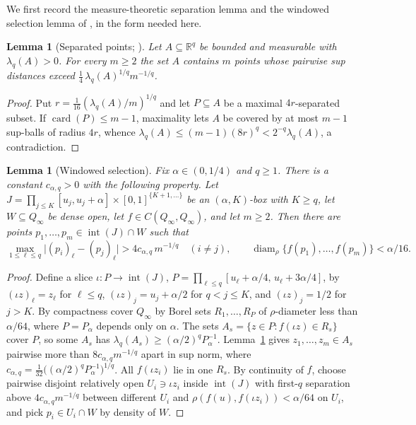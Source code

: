 \documentclass[11pt]{article}
\newtheorem{lemma}[theorem]{Lemma}
\newcommand{\Q}{Q_\infty}
\newcommand{\diam}{\operatorname{diam}}
\begin{document}
We first record the measure-theoretic separation lemma and the windowed selection
lemma of \cite{Shmalo2026}, in the form needed here.

\begin{lemma}[{Separated points; \cite[Lemma 5.1]{Shmalo2026}}]\label{lem:separated}
Let $A\subseteq\mathbb R^{q}$ be bounded and measurable with $\lambda_q(A)>0$.  For
every $m\ge2$ the set $A$ contains $m$ points whose pairwise sup distances exceed
$\tfrac14\,\lambda_q(A)^{1/q}m^{-1/q}$.
\end{lemma}

\begin{proof}
Put $r=\tfrac1{16}(\lambda_q(A)/m)^{1/q}$ and let $P\subseteq A$ be a maximal
$4r$-separated subset.  If $\operatorname{card}(P)\le m-1$, maximality lets $A$ be
covered by at most $m-1$ sup-balls of radius $4r$, whence
$\lambda_q(A)\le(m-1)(8r)^q<2^{-q}\lambda_q(A)$, a contradiction.
\end{proof}

\begin{lemma}[Windowed selection]\label{lem:selection}
Fix $\alpha\in(0,1/4)$ and $q\ge1$.  There is a constant $c_{\alpha,q}>0$ with the
following property.  Let $J=\prod_{j\le K}[u_j,u_j+\alpha]\times[0,1]^{\{K+1,\dots\}}$
be an $(\alpha,K)$-box with $K\ge q$, let $W\subseteq\Q$ be dense open, let
$f\in C(\Q,\Q)$, and let $m\ge2$.  Then there are points
$p_1,\dots,p_m\in\operatorname{int}(J)\cap W$ such that
\[
\max_{1\le\ell\le q}\bigl|(p_i)_\ell-(p_j)_\ell\bigr|>4c_{\alpha,q}\,m^{-1/q}
\quad(i\ne j),
\qquad
\diam_\rho\{f(p_1),\dots,f(p_m)\}<\alpha/16 .
\]
\end{lemma}

\begin{proof}
Define a slice $\iota:P\to\operatorname{int}(J)$,
$P=\prod_{\ell\le q}[u_\ell+\alpha/4,\,u_\ell+3\alpha/4]$, by
$(\iota z)_\ell=z_\ell$ for $\ell\le q$, $(\iota z)_j=u_j+\alpha/2$ for $q<j\le K$,
and $(\iota z)_j=1/2$ for $j>K$.  By compactness cover $\Q$ by Borel sets
$R_1,\dots,R_P$ of $\rho$-diameter less than $\alpha/64$, where $P=P_\alpha$ depends
only on $\alpha$.  The sets $A_s=\{z\in P: f(\iota z)\in R_s\}$ cover $P$, so some
$A_s$ has $\lambda_q(A_s)\ge(\alpha/2)^qP_\alpha^{-1}$.  Lemma~\ref{lem:separated}
gives $z_1,\dots,z_m\in A_s$ pairwise more than $8c_{\alpha,q}m^{-1/q}$ apart in sup
norm, where $c_{\alpha,q}=\tfrac1{32}\bigl((\alpha/2)^qP_\alpha^{-1}\bigr)^{1/q}$.
All $f(\iota z_i)$ lie in one $R_s$.  By continuity of $f$, choose pairwise disjoint
relatively open $U_i\ni\iota z_i$ inside $\operatorname{int}(J)$ with first-$q$
separation above $4c_{\alpha,q}m^{-1/q}$ between different $U_i$ and
$\rho(f(u),f(\iota z_i))<\alpha/64$ on $U_i$, and pick
$p_i\in U_i\cap W$ by density of $W$.
\end{proof}
\end{document}
